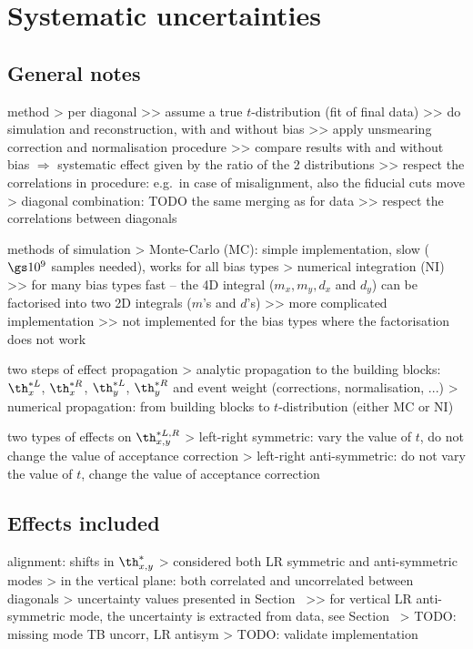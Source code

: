 \section[systematics]{Systematic uncertainties}

\subsection[systematics-general]{General notes}

\> method
\>> per diagonal
\>>> assume a true $t$-distribution (fit of final data)
\>>> do simulation and reconstruction, with and without bias
\>>> apply unsmearing correction and normalisation procedure
\>>> compare results with and without bias $\Rightarrow$ systematic effect given by the ratio of the 2 distributions
\>>> respect the correlations in procedure: e.g.~in case of misalignment, also the fiducial cuts move
\>> diagonal combination: TODO the same merging as for data
\>>> respect the correlations between diagonals

 methods of simulation
\>> Monte-Carlo (MC): simple implementation, slow ($\gs 10^9$ samples needed), works for all bias types
\>> numerical integration (NI)
\>>> for many bias types fast -- the 4D integral ($m_x, m_y, d_x$ and $d_y$) can be factorised into two 2D integrals ($m$'s and $d$'s)
\>>> more complicated implementation
\>>> not implemented for the bias types where the factorisation does not work

\> two steps of effect propagation
\>> analytic propagation to the building blocks: $\th^{*L}_x$, $\th^{*R}_x$, $\th^{*L}_y$, $\th^{*R}_y$ and event weight (corrections, normalisation, ...)
\>> numerical propagation: from building blocks to $t$-distribution (either MC or NI)

\> two types of effects on $\th^{*L,R}_{x, y}$
\>> left-right symmetric: vary the value of $t$, do not change the value of acceptance correction
\>> left-right anti-symmetric: do not vary the value of $t$, change the value of acceptance correction


\subsection[systematics-effects]{Effects included}

\> alignment: shifts in $\th^*_{x,y}$
\>> considered both LR symmetric and anti-symmetric modes
\>> in the vertical plane: both correlated and uncorrelated between diagonals
\>> uncertainty values presented in Section~
\>>> for vertical LR anti-symmetric mode, the uncertainty is extracted from data, see Section~
\>> TODO: missing mode TB uncorr, LR antisym
\>> TODO: validate implementation

